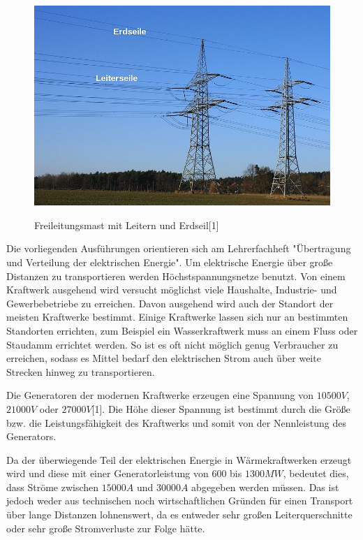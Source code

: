 \begin{figure}[t]
	\centering
	{\includegraphics[scale=0.5]{bilder/erdseil}\label{fig_erdseil}
	}\\
	\caption[Freileitungsmast mit Leitern und Erdseil]{Freileitungsmast mit Leitern und Erdseil[1]}
	\label{fig_erdseil}
\end{figure}
Die vorliegenden Ausführungen orientieren sich am Lehrerfachheft "Übertragung und Verteilung der elektrischen Energie".
Um elektrische Energie über große Distanzen zu transportieren werden Höchstspannungsnetze benutzt. Von einem Kraftwerk ausgehend wird versucht möglichst viele Haushalte, Industrie- und Gewerbebetriebe zu erreichen. Davon ausgehend wird auch der Standort der meisten Kraftwerke bestimmt. Einige Kraftwerke lassen sich nur an bestimmten Standorten errichten, zum Beispiel ein Wasserkraftwerk muss an einem Fluss oder Staudamm errichtet werden. So ist es oft nicht möglich genug Verbraucher zu erreichen, sodass es Mittel bedarf den elektrischen Strom auch über weite Strecken hinweg zu transportieren.

Die Generatoren der modernen Kraftwerke erzeugen eine Spannung von $10500 V$, $21000V$ oder $27000V$[1]. Die Höhe dieser Spannung ist bestimmt durch die Größe bzw. die Leistungsfähigkeit des Kraftwerks und somit von der Nennleistung des Generators.

Da der überwiegende Teil der elektrischen Energie in Wärmekraftwerken erzeugt wird und diese mit einer Generatorleistung von $600$ bis $1300MW$, bedeutet dies, dass Ströme zwischen $15000A$ und $30000A$ abgegeben werden müssen. Das ist jedoch weder aus technischen noch wirtschaftlichen Gründen für einen Transport über lange Distanzen lohnenswert, da es entweder sehr großen Leiterquerschnitte oder sehr große Stromverluste zur Folge hätte.

